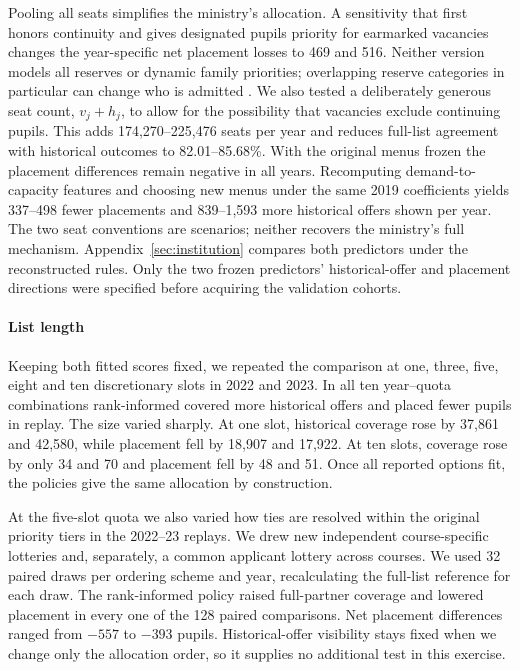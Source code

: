 Pooling all seats simplifies the ministry's allocation. A sensitivity that first honors continuity and gives designated pupils priority for earmarked vacancies changes the year-specific net placement losses to 469 and 516. Neither version models all reserves or dynamic family priorities; overlapping reserve categories in particular can change who is admitted \citep{doganreserves}. We also tested a deliberately generous seat count, $v_j+h_j$, to allow for the possibility that vacancies exclude continuing pupils. This adds 174,270--225,476 seats per year and reduces full-list agreement with historical outcomes to 82.01--85.68\%. With the original menus frozen the placement differences remain negative in all years. Recomputing demand-to-capacity features and choosing new menus under the same 2019 coefficients yields 337--498 fewer placements and 839--1,593 more historical offers shown per year. The two seat conventions are scenarios; neither recovers the ministry's full mechanism. Appendix~\ref{sec:institution} compares both predictors under the reconstructed rules. Only the two frozen predictors' historical-offer and placement directions were specified before acquiring the validation cohorts.

\paragraph{List length}
Keeping both fitted scores fixed, we repeated the comparison at one, three, five, eight and ten discretionary slots in 2022 and 2023. In all ten year--quota combinations rank-informed covered more historical offers and placed fewer pupils in replay. The size varied sharply. At one slot, historical coverage rose by 37,861 and 42,580, while placement fell by 18,907 and 17,922. At ten slots, coverage rose by only 34 and 70 and placement fell by 48 and 51. Once all reported options fit, the policies give the same allocation by construction.

At the five-slot quota we also varied how ties are resolved within the original priority tiers in the 2022--23 replays. We drew new independent course-specific lotteries and, separately, a common applicant lottery across courses. We used 32 paired draws per ordering scheme and year, recalculating the full-list reference for each draw. The rank-informed policy raised full-partner coverage and lowered placement in every one of the 128 paired comparisons. Net placement differences ranged from $-557$ to $-393$ pupils. Historical-offer visibility stays fixed when we change only the allocation order, so it supplies no additional test in this exercise.
